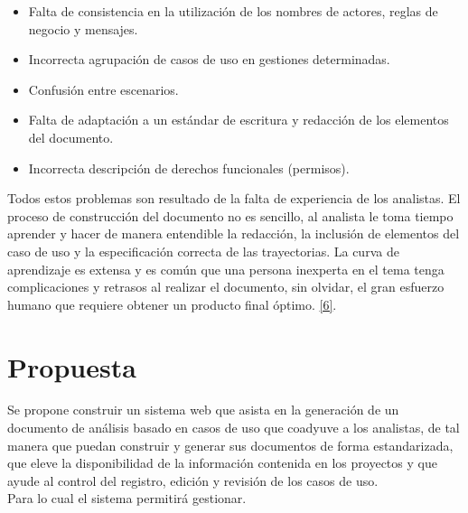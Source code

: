 \begin{itemize}
	\item Falta de consistencia en la utilización de los nombres de actores, reglas de negocio y mensajes.
	\item Incorrecta agrupación de casos de uso en gestiones determinadas.
	\item Confusión entre escenarios.
	\item Falta de adaptación a un estándar de escritura y redacción de los elementos del documento.
	\item Incorrecta descripción de derechos funcionales (permisos).
\end{itemize}

Todos estos problemas son resultado de la falta de experiencia de los analistas. El proceso de construcción del documento no es sencillo, al analista le toma tiempo aprender y hacer de manera entendible la redacción, la inclusión de elementos del caso de uso y la especificación correcta de las trayectorias. La curva de aprendizaje es extensa y es común que una persona inexperta en el tema tenga complicaciones y retrasos al realizar el documento, sin olvidar, el gran esfuerzo humano que requiere obtener un producto final óptimo. \hyperlink{b06}{[6]}.

\section{Propuesta}

Se propone construir un sistema web que asista en la generación de un documento de análisis basado en casos de uso que coadyuve a los analistas, de tal manera que puedan construir y generar sus documentos de forma estandarizada, que eleve la disponibilidad de la información contenida en los proyectos y que ayude al control del registro, edición y revisión de los casos de uso.\\

Para lo cual el sistema permitirá gestionar.

